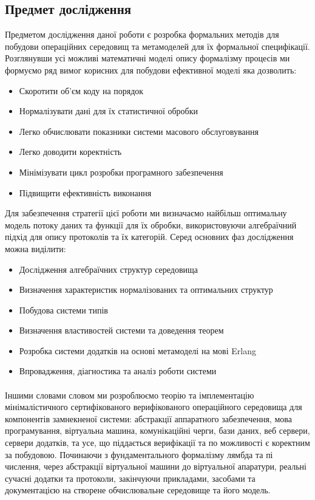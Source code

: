 \documentclass[11pt,oneside]{article}
\begin{document}
\newpage
\subsection{Предмет дослідження}
\vspace{0.5cm}

   Предметом дослідження даної роботи є розробка формальних методів для побудови
   операційних середовищ та метамоделей для їх формальної специфікації. Розглянувши усі
   можливі математичні моделі опису формалізму процесів ми формуємо ряд вимог корисних
   для побудови ефективної моделі яка дозволить:

\begin{itemize}
   \item Скоротити об’єм коду на порядок
   \item Нормалізувати дані для їх статистичної обробки
   \item Легко обчислювати показники системи масового обслуговування
   \item Легко доводити коректність
   \item Мінімізувати цикл розробки програмного забезпечення
   \item Підвищити ефективність виконання
\end{itemize}

  Для забезпечення стратегії цієї роботи ми визначаємо найбільш оптимальну модель
  потоку даних та функції для їх обробки, використовуючи алгебраїчний підхід
  для опису протоколів та їх категорій. Серед основних фаз дослідження можна виділити:

\begin{itemize}
   \item Дослідження алгебраїчних структур середовища
   \item Визначення характеристик нормалізованих та оптимальних структур
   \item Побудова системи типів
   \item Визначення властивостей системи та доведення теорем
   \item Розробка системи додатків на основі метамоделі на мові Erlang
   \item Впровадження, діагностика та аналіз роботи системи
\end{itemize}

   \paragraph{}
   Іншими словами словом ми розроблюємо теорію та імплементацію мінімалістичного
   сертифікованого верифікованого операційного середовища для компонентів замнекненої системи:
   абстракції аппаратного забезпечення, мова програмування, віртуальна машина, комунікаційні
   черги, бази даних, веб сервери, сервери додатків, та усе, що піддається верифікації та по
   можливості є коректним за побудовою. Починаючи з фундаментального формалізму лямбда та пі числення,
   через абстракції віртуальної машини до віртуальної апаратури, реальні сучасні додатки та протоколи,
   закінчуючи прикладами, засобами та документацією на створене обчислювальне середовище та його модель.\\
\end{document}
